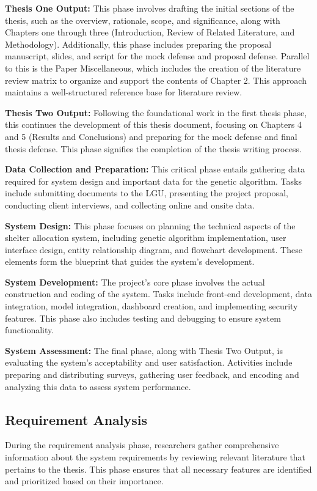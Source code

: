 	\textbf{Thesis One Output:} This phase involves drafting the initial sections of the thesis, such as the overview, rationale, scope, and significance, along with Chapters one through three (Introduction, Review of Related Literature, and Methodology). Additionally, this phase includes preparing the proposal manuscript, slides, and script for the mock defense and proposal defense. Parallel to this is the Paper Miscellaneous, which includes the creation of the literature review matrix to organize and support the contents of Chapter 2. This approach maintains a well-structured reference base for literature review.
	
	\textbf{Thesis Two Output:} Following the foundational work in the first thesis phase, this continues the development of this thesis document, focusing on Chapters 4 and 5 (Results and Conclusions) and preparing for the mock defense and final thesis defense. This phase signifies the completion of the thesis writing process.
	
	\textbf{Data Collection and Preparation:} This critical phase entails gathering data required for system design and important data for the genetic algorithm. Tasks include submitting documents to the LGU, presenting the project proposal, conducting client interviews, and collecting online and onsite data.
	
	\textbf{System Design:} This phase focuses on planning the technical aspects of the shelter allocation system, including genetic algorithm implementation, user interface design, entity relationship diagram, and flowchart development. These elements form the blueprint that guides the system's development.
	
	\textbf{System Development:} The project's core phase involves the actual construction and coding of the system. Tasks include front-end development, data integration, model integration, dashboard creation, and implementing security features. This phase also includes testing and debugging to ensure system functionality.
	
	\textbf{System Assessment:} The final phase, along with Thesis Two Output, is evaluating the system's acceptability and user satisfaction. Activities include preparing and distributing surveys, gathering user feedback, and encoding and analyzing this data to assess system performance.

\subsection{Requirement Analysis}
	During the requirement analysis phase, researchers gather comprehensive information about the system requirements by reviewing relevant literature that pertains to the thesis. This phase ensures that all necessary features are identified and prioritized based on their importance.
	

